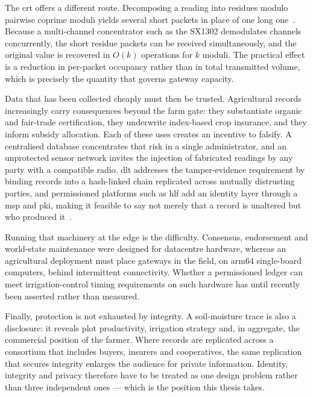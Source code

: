 \documentclass[12pt,a4paper,oneside]{book}
\begin{document}
The \gls{crt} offers a different route. Decomposing a reading into residues
modulo pairwise coprime moduli yields several short packets in place of one long
one~\cite{garner1959residue, ding1996remainder}. Because a multi-channel
concentrator such as the SX1302 demodulates channels concurrently, the short
residue packets can be received simultaneously, and the original value is
recovered in $O(k)$ operations for $k$ moduli. The practical effect is a
reduction in per-packet occupancy rather than in total transmitted volume, which
is precisely the quantity that governs gateway capacity.

Data that has been collected cheaply must then be trusted. Agricultural records
increasingly carry consequences beyond the farm gate: they substantiate organic
and fair-trade certification, they underwrite index-based crop insurance, and
they inform subsidy allocation. Each of these uses creates an incentive to
falsify. A centralised database concentrates that risk in a single
administrator, and an unprotected sensor network invites the injection of
fabricated readings by any party with a compatible radio. \gls{dlt} addresses
the tamper-evidence requirement by binding records into a hash-linked chain
replicated across mutually distrusting parties, and permissioned platforms such
as \gls{hlf} add an identity layer through a \gls{msp} and \gls{pki}, making it
feasible to say not merely that a record is unaltered but who produced
it~\cite{tar2023fabric, jayaram2023hyperledger, dube2024fabricIrrigation}.

Running that machinery at the edge is the difficulty. Consensus, endorsement and
world-state maintenance were designed for datacentre hardware, whereas an
agricultural deployment must place gateways in the field, on \gls{arm64}
single-board computers, behind intermittent connectivity. Whether a permissioned
ledger can meet irrigation-control timing requirements on such hardware has
until recently been asserted rather than measured.

Finally, protection is not exhausted by integrity. A soil-moisture trace is also
a disclosure: it reveals plot productivity, irrigation strategy and, in
aggregate, the commercial position of the farmer. Where records are replicated
across a consortium that includes buyers, insurers and cooperatives, the same
replication that secures integrity enlarges the audience for private
information. Identity, integrity and privacy therefore have to be treated as one
design problem rather than three independent ones — which is the position this
thesis takes.
\end{document}
